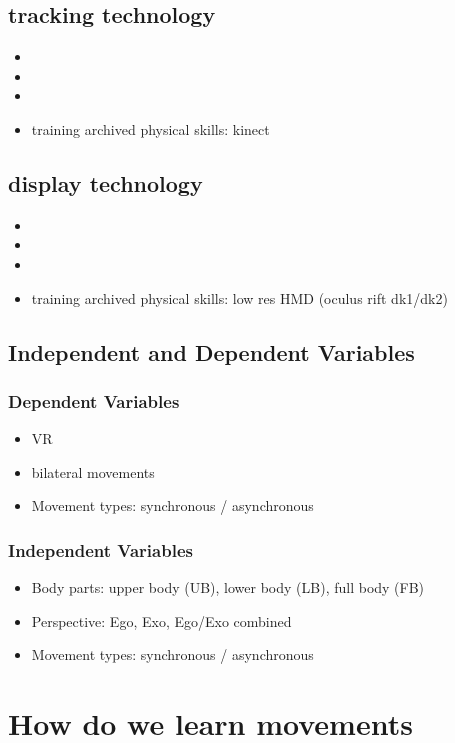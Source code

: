 \subsection{tracking technology}
\begin{itemize}
	\item 
	\item 
	\item 
	\item training archived physical skills: kinect
\end{itemize}
\subsection{display technology}
\begin{itemize}
	\item
	\item 
	\item 
	\item training archived physical skills: low res HMD (oculus rift dk1/dk2)
\end{itemize}
\subsection{Independent and Dependent Variables}
\subsubsection{Dependent Variables}
\begin{itemize}
	\item VR
	\item bilateral movements
	\item Movement types: synchronous  / asynchronous 
\end{itemize}
\subsubsection{Independent Variables}
\begin{itemize}
	\item Body parts: upper body (UB), lower body (LB), full body (FB)
	\item Perspective: Ego, Exo, Ego/Exo combined
	\item Movement types: synchronous  / asynchronous 
\end{itemize}
\section{How do we learn movements}

